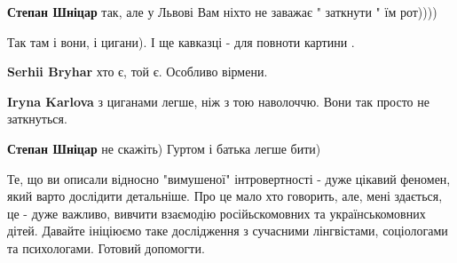 \begin{itemize}
\begin{itemize}
 
\textbf{Степан Шніцар} так, але у Львові Вам ніхто не заважає " заткнути " їм рот))))

 
Так там і вони, і цигани). І ще кавказці - для повноти картини \Smiley[1.0][yellow].

 
\textbf{Serhii Bryhar} хто є, той є. Особливо вірмени.

 
\textbf{Iryna Karlova} з циганами легше, ніж з тою наволоччю. Вони так просто не заткнуться.

 
\textbf{Степан Шніцар} не скажіть) Гуртом і батька легше бити)
\end{itemize}

 

Те, що ви описали відносно "вимушеної" інтровертності - дуже цікавий феномен,
який варто дослідити детальніше. Про це мало хто говорить, але, мені здається,
це - дуже важливо, вивчити взаємодію російьскомовних та українськомовних дітей.
Давайте ініціюємо таке дослідження з сучасними лінгвістами, соціологами та
психологами. Готовий допомогти.



\end{itemize}
